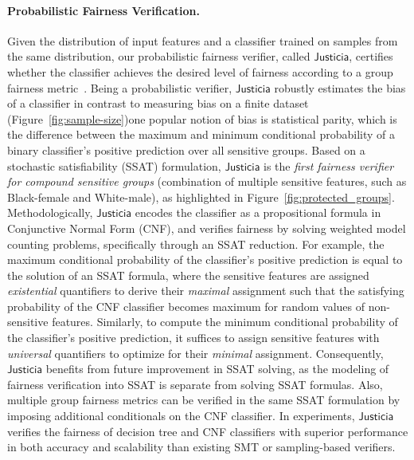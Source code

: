 \documentclass{article}
\begin{document}
	\paragraph{Probabilistic Fairness Verification.} Given the distribution of input features and a classifier trained on samples from the same distribution, our probabilistic fairness verifier, called $ \mathsf{Justicia} $, certifies whether the classifier achieves the desired level of fairness according to a group fairness metric~\cite{ghosh2021justicia}. Being a probabilistic verifier, $ \mathsf{Justicia} $ robustly estimates the bias of a classifier in contrast to measuring bias on a finite dataset (Figure~\ref{fig:sample-size})\textemdash one popular notion of bias is statistical parity, which is the difference between the maximum and minimum conditional probability of a binary classifier's positive prediction over all sensitive groups. Based on a stochastic satisfiability (SSAT) formulation, $ \mathsf{Justicia} $ is the \emph{first fairness verifier for compound sensitive groups} (combination of multiple sensitive features, such as Black-female and White-male), as highlighted in Figure~\ref{fig:protected_groups}. Methodologically, $ \mathsf{Justicia} $ encodes the classifier as a propositional formula in Conjunctive Normal Form (CNF), and verifies fairness by solving weighted model counting problems, specifically through an SSAT reduction. For example, the maximum conditional probability of the classifier's positive prediction is equal to the solution of an SSAT formula, where the sensitive features are assigned \emph{existential} quantifiers to derive their \emph{maximal} assignment such that the satisfying probability of the CNF classifier becomes maximum for random values of non-sensitive features. Similarly, to compute the minimum conditional probability of the classifier's positive prediction, it suffices to assign sensitive features with \emph{universal} quantifiers to optimize for their \emph{minimal} assignment. Consequently, $ \mathsf{Justicia} $ benefits from future improvement in SSAT solving, as the modeling of fairness verification into SSAT is separate from solving SSAT formulas. Also, multiple group fairness metrics can be verified in the same SSAT formulation by imposing additional conditionals on the CNF classifier. In experiments, $ \mathsf{Justicia} $ verifies the fairness of decision tree and CNF classifiers with superior performance in both accuracy and scalability than existing SMT or sampling-based verifiers. 
	
	
\end{document}
